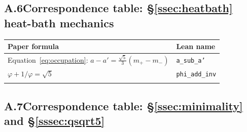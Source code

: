\documentclass[sn-mathphys-num,Numbered]{sn-jnl}
\theoremstyle{thmstyleone}
\theoremstyle{thmstylethree}
\theoremstyle{thmstyletwo}
\begin{document}
\begin{appendices}
\subsection*{A.6\quad Correspondence table: \S\ref{ssec:heatbath} heat-bath mechanics}


\vspace{6pt}
\noindent{}
\label{tab:lean-heatbath}
\begin{tabular}{@{}p{6.5cm}p{5.0cm}@{}}
\toprule
Paper formula & Lean name \\
\midrule
Equation~\eqref{eq:occupation}:
  $a-a'=\tfrac{\sqrt{5}}{3}(m_{+}-m_{-})$ &
  \texttt{a\_sub\_a'} \\
$\varphi + 1/\varphi = \sqrt{5}$ &
  \texttt{phi\_add\_inv} \\
\botrule
\end{tabular}
\vspace{4pt}


\subsection*{A.7\quad Correspondence table: \S\ref{ssec:minimality}
  and \S\ref{sssec:qsqrt5}}



\end{appendices}
\end{document}
